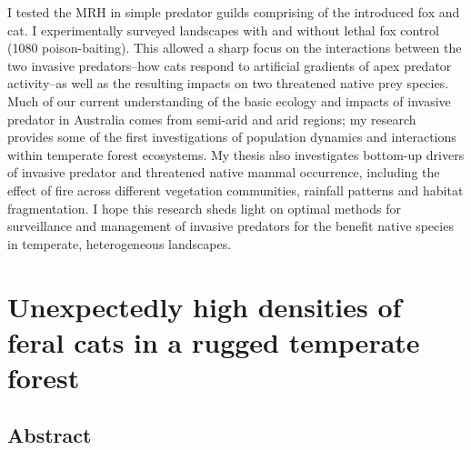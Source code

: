 \documentclass[11pt,a4paper,titlepage,twoside,openright]{style/unimelbthesis}
\begin{document}
\begin{mainmatter}
I tested the MRH in simple predator guilds comprising of the introduced fox and cat. I experimentally surveyed landscapes with and without lethal fox control (1080 poison-baiting). This allowed a sharp focus on the interactions between the two invasive predators--how cats respond to artificial gradients of apex predator activity--as well as the resulting impacts on two threatened native prey species. Much of our current understanding of the basic ecology and impacts of invasive predator in Australia comes from semi-arid and arid regions; my research provides some of the first investigations of population dynamics and interactions within temperate forest ecosystems. My thesis also investigates bottom-up drivers of invasive predator and threatened native mammal occurrence, including the effect of fire across different vegetation communities, rainfall patterns and habitat fragmentation. I hope this research sheds light on optimal methods for surveillance and management of invasive predators for the benefit native species in temperate, heterogeneous landscapes.

\hypertarget{otways17}{%
\chapter{Unexpectedly high densities of feral cats in a rugged temperate forest}\label{otways17}}

\hypertarget{abstract}{%
\section*{Abstract}\label{abstract}}


\end{mainmatter}
\end{document}
